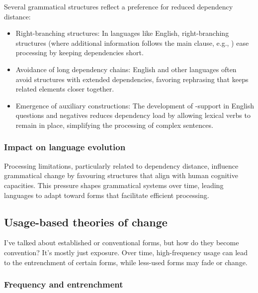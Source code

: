 Several grammatical structures reflect a preference for reduced dependency distance:
\begin{itemize}[noitemsep]
    \item Right-branching structures: In languages like English, right-branching structures (where additional information follows the main clause, e.g., ) ease processing by keeping dependencies short.

    \item Avoidance of long dependency chains: English and other languages often avoid structures with extended dependencies, favoring rephrasing that keeps related elements closer together.

    \item Emergence of auxiliary constructions: The development of -support in English questions and negatives reduces dependency load by allowing lexical verbs to remain in place, simplifying the processing of complex sentences.
\end{itemize}

\subsubsection{Impact on language evolution}

Processing limitations, particularly related to dependency distance, influence grammatical change by favouring structures that align with human cognitive capacities. This pressure shapes grammatical systems over time, leading languages to adapt toward forms that facilitate efficient processing.

\subsection{Usage-based theories of change}

I've talked about established or conventional forms, but how do they become convention? It's mostly just exposure. Over time, high-frequency usage can lead to the entrenchment of certain forms, while less-used forms may fade or change.

\subsubsection{Frequency and entrenchment}

